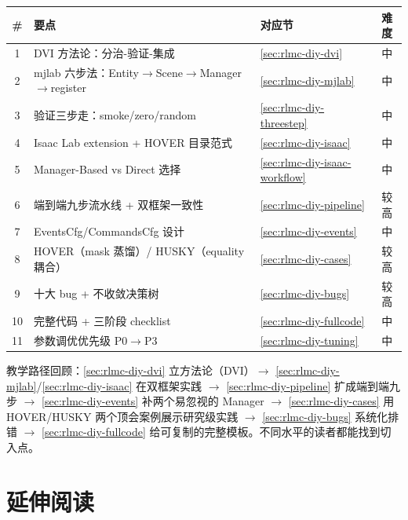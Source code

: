 \begin{center}
\small
\begin{tabular}{@{}clp{5.4cm}c@{}}
\toprule
\# & 要点 & 对应节 & 难度 \\
\midrule
1 & DVI 方法论：分治-验证-集成 & \cref{sec:rlmc-diy-dvi} & 中 \\
2 & mjlab 六步法：Entity$\to$Scene$\to$Manager$\to$register & \cref{sec:rlmc-diy-mjlab} & 中 \\
3 & 验证三步走：smoke/zero/random & \cref{sec:rlmc-diy-threestep} & 中 \\
4 & Isaac Lab extension + HOVER 目录范式 & \cref{sec:rlmc-diy-isaac} & 中 \\
5 & Manager-Based vs Direct 选择 & \cref{sec:rlmc-diy-isaac-workflow} & 中 \\
6 & 端到端九步流水线 + 双框架一致性 & \cref{sec:rlmc-diy-pipeline} & 较高 \\
7 & EventsCfg/CommandsCfg 设计 & \cref{sec:rlmc-diy-events} & 中 \\
8 & HOVER（mask 蒸馏）/ HUSKY（equality 耦合） & \cref{sec:rlmc-diy-cases} & 较高 \\
9 & 十大 bug + 不收敛决策树 & \cref{sec:rlmc-diy-bugs} & 较高 \\
10 & 完整代码 + 三阶段 checklist & \cref{sec:rlmc-diy-fullcode} & 中 \\
11 & 参数调优优先级 P0$\to$P3 & \cref{sec:rlmc-diy-tuning} & 中 \\
\bottomrule
\end{tabular}
\end{center}

教学路径回顾：\cref{sec:rlmc-diy-dvi} 立方法论（DVI）$\to$ \cref{sec:rlmc-diy-mjlab}/\cref{sec:rlmc-diy-isaac} 在双框架实践 $\to$ \cref{sec:rlmc-diy-pipeline} 扩成端到端九步 $\to$ \cref{sec:rlmc-diy-events} 补两个易忽视的 Manager $\to$ \cref{sec:rlmc-diy-cases} 用 HOVER/HUSKY 两个顶会案例展示研究级实践 $\to$ \cref{sec:rlmc-diy-bugs} 系统化排错 $\to$ \cref{sec:rlmc-diy-fullcode} 给可复制的完整模板。不同水平的读者都能找到切入点。

\section{延伸阅读}
\label{sec:rlmc-diy-further}

